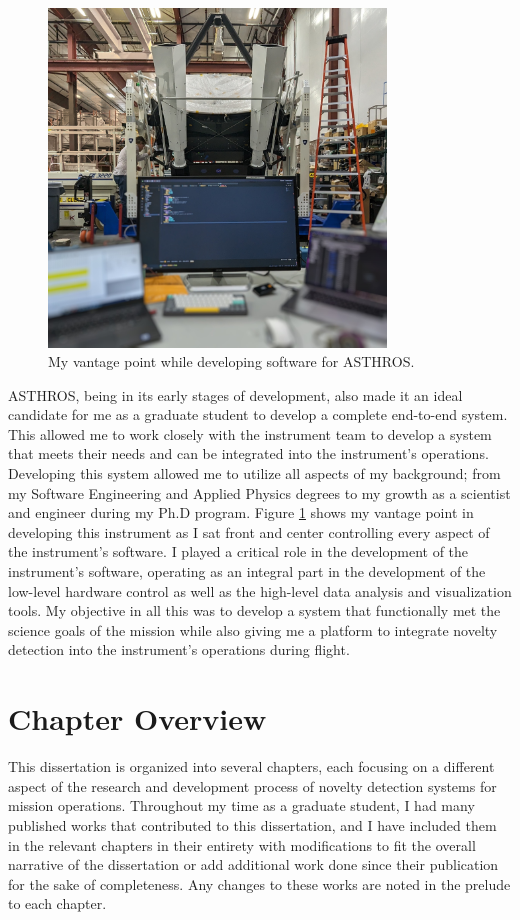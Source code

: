 \begin{figure}
\centering
\includegraphics[width=0.8\textwidth]{figs/intro/asthros_instrument.jpg}
\caption[Command Station for Software Development of ASTHROS]{
    My vantage point while developing software for ASTHROS. 
}
\label{intro/fig:asthros_instrument}
\end{figure}

ASTHROS, being in its early stages of development, also made it an ideal candidate for me as a graduate student to develop a complete end-to-end system.
This allowed me to work closely with the instrument team to develop a system that meets their needs and can be integrated into the instrument's operations.
Developing this system allowed me to utilize all aspects of my background; from my Software Engineering and Applied Physics degrees to my growth as a scientist and engineer during my Ph.D program.
Figure \ref{intro/fig:asthros_instrument} shows my vantage point in developing this instrument as I sat front and center controlling every aspect of the instrument's software. 
I played a critical role in the development of the instrument's software, operating as an integral part in the development of the low-level hardware control as well as the high-level data analysis and visualization tools.
My objective in all this was to develop a system that functionally met the science goals of the mission while also giving me a platform to integrate novelty detection into the instrument's operations during flight.

\section{Chapter Overview}
This dissertation is organized into several chapters, each focusing on a different aspect of the research and development process of novelty detection systems for mission operations.
Throughout my time as a graduate student, I had many published works that contributed to this dissertation, and I have included them in the relevant chapters in their entirety with modifications to fit the overall narrative of the dissertation or add additional work done since their publication for the sake of completeness.
Any changes to these works are noted in the prelude to each chapter.

